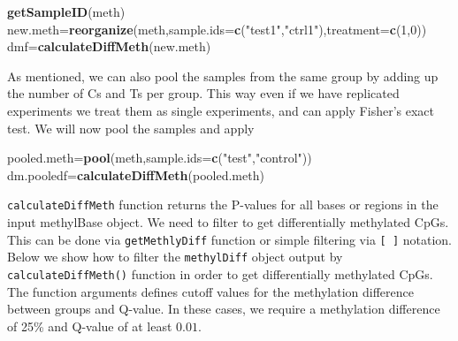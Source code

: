\documentclass[12pt,]{krantz}
\newenvironment{Shaded}{\begin{snugshade}}{\end{snugshade}}
\newcommand{\DataTypeTok}[1]{\textcolor[rgb]{0.13,0.29,0.53}{#1}}
\newcommand{\DecValTok}[1]{\textcolor[rgb]{0.00,0.00,0.81}{#1}}
\newcommand{\KeywordTok}[1]{\textcolor[rgb]{0.13,0.29,0.53}{\textbf{#1}}}
\newcommand{\NormalTok}[1]{#1}
\newcommand{\StringTok}[1]{\textcolor[rgb]{0.31,0.60,0.02}{#1}}
\begin{document}
\begin{Shaded}
\begin{Highlighting}[]
\KeywordTok{getSampleID}\NormalTok{(meth)}
\NormalTok{new.meth=}\KeywordTok{reorganize}\NormalTok{(meth,}\DataTypeTok{sample.ids=}\KeywordTok{c}\NormalTok{(}\StringTok{"test1"}\NormalTok{,}\StringTok{"ctrl1"}\NormalTok{),}\DataTypeTok{treatment=}\KeywordTok{c}\NormalTok{(}\DecValTok{1}\NormalTok{,}\DecValTok{0}\NormalTok{))}
\NormalTok{dmf=}\KeywordTok{calculateDiffMeth}\NormalTok{(new.meth)}
\end{Highlighting}
\end{Shaded}

As mentioned, we can also pool the samples from the same group by adding up the number of Cs and Ts per group. This way even if we have replicated experiments we treat them as single experiments, and can apply Fisher's exact test. We will now pool the samples and apply

\begin{Shaded}
\begin{Highlighting}[]
\NormalTok{pooled.meth=}\KeywordTok{pool}\NormalTok{(meth,}\DataTypeTok{sample.ids=}\KeywordTok{c}\NormalTok{(}\StringTok{"test"}\NormalTok{,}\StringTok{"control"}\NormalTok{))}
\NormalTok{dm.pooledf=}\KeywordTok{calculateDiffMeth}\NormalTok{(pooled.meth)}
\end{Highlighting}
\end{Shaded}

\texttt{calculateDiffMeth} function returns the P-values for all bases or regions in the input methylBase object. We need to filter to get differentially methylated CpGs. This can be done via \texttt{getMethlyDiff} function or simple filtering via \texttt{{[}\ {]}} notation. Below we show how to filter the \texttt{methylDiff} object output by \texttt{calculateDiffMeth()} function in order to get differentially methylated CpGs. The function arguments defines cutoff values for the methylation difference between groups and Q-value. In these cases, we require a methylation difference of 25\% and Q-value of at least \(0.01\).
\end{document}
